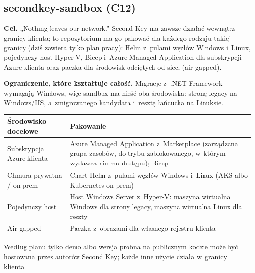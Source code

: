 
\subsection{secondkey-sandbox (C12)}\label{sec:faza02-sandbox}

\textbf{Cel.} „Nothing leaves our network.” Second Key ma zawsze działać wewnątrz granicy
klienta; to repozytorium ma go pakować dla każdego rodzaju takiej granicy (dziś zawiera
tylko plan pracy): Helm z~pulami węzłów Windows i~Linux, pojedynczy host Hyper-V, Bicep
i~Azure Managed Application dla subskrypcji Azure klienta oraz paczka dla środowisk
odciętych od sieci (air-gapped).

\textbf{Ograniczenie, które kształtuje całość.} Migracje z~.NET Framework wymagają Windows,
więc sandbox ma nieść oba środowiska: stronę legacy na Windows/IIS, a~zmigrowanego kandydata
i~resztę łańcucha na Linuksie.

\begin{tabularx}{\linewidth}{@{}>{\raggedright\arraybackslash}p{4.4cm} >{\raggedright\arraybackslash}X@{}}
\toprule
Środowisko docelowe & Pakowanie \\
\midrule
Subskrypcja Azure klienta & Azure Managed Application z~Marketplace (zarządzana grupa zasobów, do trybu zablokowanego, w~którym wydawca nie ma dostępu); Bicep \\
Chmura prywatna / on-prem & Chart Helm z~pulami węzłów Windows i~Linux (AKS albo Kubernetes on-prem) \\
Pojedynczy host & Host Windows Server z~Hyper-V: maszyna wirtualna Windows dla strony legacy, maszyna wirtualna Linux dla reszty \\
Air-gapped & Paczka z~obrazami dla własnego rejestru klienta \\
\bottomrule
\end{tabularx}

Według planu tylko demo albo wersja próbna na publicznym kodzie może być hostowana przez
autorów Second Key; każde inne użycie działa w~granicy klienta.

